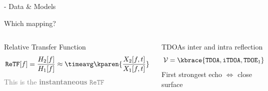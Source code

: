 \begin{frame}{\lantern - Data \& Models}
\begin{block}{Which mapping?}
\begin{columns}[onlytextwidth]
            \centering
        \end{columns}

        \begin{columns}[T,onlytextwidth]
            \centering
            Relative Transfer Function
            \begin{equation*}
                    \mathtt{ReTF}[f] = \frac{H_2[f]}{H_1[f]} \approx \timeavg \kparen{\frac{X_2[f,t]}{X_1[f,t]}}
            \end{equation*}
            \textcolor{gray}{\small This is the \textbf{instantaneous} $\mathtt{ReTF}$}


            \centering
            TDOAs inter and intra reflection
            \begin{equation*}
                \mathcal{V} = \kbrace{\mathtt{TDOA}, \mathtt{iTDOA}, \mathtt{TDOE}_1}
        \end{equation*}
        \textcolor{myred}{First strongest echo $\Leftrightarrow$ close surface}
        \end{columns}
    \end{block}


\end{frame}
